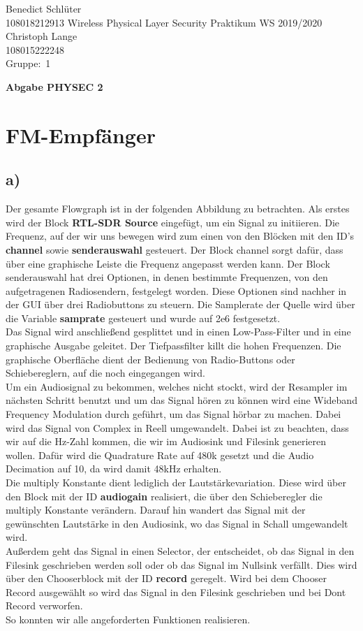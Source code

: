 \documentclass[12pt,a4paper]{article}
\newcommand{\student}{Benedict Schlüter\\ 108018212913 } %
\newcommand{\partner}{Christoph Lange\\ 108015222248} %
\newcommand{\group}{1} %
\newcommand{\hwheadtwo}{$ $
  \vspace{-2cm}
  
\noindent \student \qquad \qquad  Wireless Physical Layer Security Praktikum \hfill WS 2019/2020 \\
\noindent \partner \\
\noindent Gruppe:~\group\\
$ $

  
\begin{center}    
{\Large \bf Abgabe PHYSEC 2}
\end{center}
}
\begin{document}
\hwheadtwo

\section{FM-Empfänger}
\subsection*{a)}
Der gesamte Flowgraph ist in der folgenden Abbildung zu betrachten. 
Als erstes wird der Block \textbf{RTL-SDR Source} eingefügt, um ein Signal zu initiieren. Die Frequenz, auf der wir uns bewegen wird zum einen von den Blöcken mit den ID's \textbf{channel} sowie \textbf{senderauswahl} gesteuert. Der Block channel sorgt dafür, dass über eine graphische Leiste die Frequenz angepasst werden kann. Der Block senderauswahl hat drei Optionen, in denen bestimmte Frequenzen, von den aufgetragenen Radiosendern, festgelegt worden. Diese Optionen sind nachher in der GUI über drei Radiobuttons zu steuern. Die Samplerate der Quelle wird über die Variable \textbf{samprate} gesteuert und wurde auf 2e6 festgesetzt.\\
Das Signal wird anschließend gesplittet und in einen Low-Pass-Filter und in eine graphische Ausgabe geleitet. Der Tiefpassfilter killt die hohen Frequenzen. Die graphische Oberfläche dient der Bedienung von Radio-Buttons oder Schiebereglern, auf die noch eingegangen wird.\\
Um ein Audiosignal zu bekommen, welches nicht stockt, wird der Resampler im nächsten Schritt benutzt und um das Signal hören zu können wird eine Wideband Frequency Modulation durch geführt, um das Signal hörbar zu machen. Dabei wird das Signal von Complex in Reell umgewandelt. Dabei ist zu beachten, dass wir auf die Hz-Zahl kommen, die wir im Audiosink und Filesink generieren wollen. Dafür wird die Quadrature Rate auf 480k gesetzt und die Audio Decimation auf 10, da wird damit 48kHz erhalten.\\
Die multiply Konstante dient lediglich der Lautstärkevariation. Diese wird über den Block mit der ID \textbf{audiogain} realisiert, die über den Schieberegler die multiply Konstante verändern. Darauf hin wandert das Signal mit der gewünschten Lautstärke in den Audiosink, wo das Signal in Schall umgewandelt wird. \\
Außerdem geht das Signal in einen Selector, der entscheidet, ob das Signal in den Filesink geschrieben werden soll oder ob das Signal im Nullsink verfällt. Dies wird über den Chooserblock mit der ID \textbf{record} geregelt. Wird bei dem Chooser Record ausgewählt so wird das Signal in den Filesink geschrieben und bei Dont Record verworfen. \\
So konnten wir alle angeforderten Funktionen realisieren.
\end{document}
